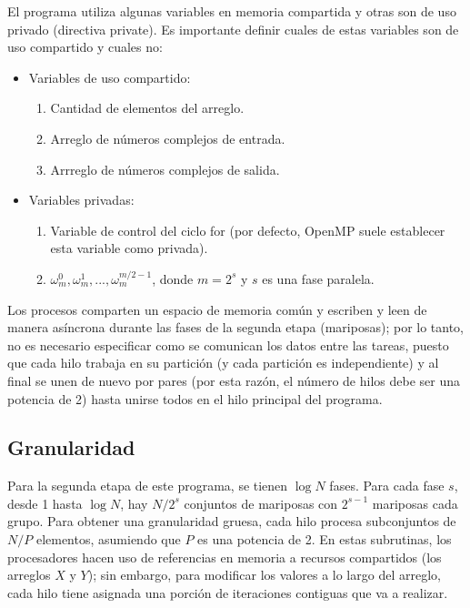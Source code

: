 \documentclass{article}
\begin{document}
El programa utiliza algunas variables en memoria compartida y otras son de uso privado (directiva private). Es importante definir cuales de estas variables son de uso compartido y cuales no:

\begin{itemize}
    \item Variables de uso compartido:
    \begin{enumerate}
        \item Cantidad de elementos del arreglo.
        \item Arreglo de números complejos de entrada.
        \item Arrreglo de números complejos de salida.
    \end{enumerate}
    \item Variables privadas:
    \begin{enumerate}
        \item Variable de control del ciclo for (por defecto, OpenMP suele establecer esta variable como privada).
        \item $\omega_{m}^{0}, \omega_{m}^{1}, ..., \omega_{m}^{m/2-1}$, donde $m=2^{s}$ y $s$ es una fase paralela.
    \end{enumerate}
\end{itemize}
Los procesos comparten un espacio de memoria común y escriben y leen de manera asíncrona durante las fases de la segunda etapa (mariposas); por lo tanto, no es necesario especificar como se comunican los datos entre las tareas, puesto que cada hilo trabaja en su partición (y cada partición es independiente) y al final se unen de nuevo por pares (por esta razón, el número de hilos debe ser una potencia de 2) hasta unirse todos en el hilo principal del programa.
\subsection{Granularidad}
Para la segunda etapa de este programa, se tienen $\log N$ fases. Para cada fase $s$, desde 1 hasta $\log N$, hay $N/2^{s}$ conjuntos de mariposas con $2^{s-1}$ mariposas cada grupo. Para obtener una granularidad gruesa, cada hilo procesa subconjuntos de $N/P$ elementos, asumiendo que $P$ es una potencia de 2. En estas subrutinas, los procesadores hacen uso de referencias en memoria a recursos compartidos (los arreglos $X$ y $Y$); sin embargo, para modificar los valores a lo largo del arreglo, cada hilo tiene asignada una porción de iteraciones contiguas que va a realizar. \\
\end{document}
